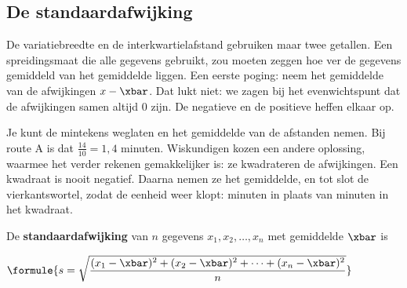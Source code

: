 
\begin{oefeningen}
\end{oefeningen}

\subsection{De standaardafwijking}

De variatiebreedte en de interkwartielafstand gebruiken maar twee getallen. Een spreidingsmaat die alle gegevens gebruikt, zou moeten zeggen hoe ver de gegevens gemiddeld van het gemiddelde liggen. Een eerste poging: neem het gemiddelde van de afwijkingen $x - \xbar$. Dat lukt niet: we zagen bij het evenwichtspunt dat de afwijkingen samen altijd 0 zijn. De negatieve en de positieve heffen elkaar op.

Je kunt de mintekens weglaten en het gemiddelde van de afstanden nemen. Bij route A is dat $\tfrac{14}{10} = 1,4$ minuten. Wiskundigen kozen een andere oplossing, waarmee het verder rekenen gemakkelijker is: ze kwadrateren de afwijkingen. Een kwadraat is nooit negatief. Daarna nemen ze het gemiddelde, en tot slot de vierkantswortel, zodat de eenheid weer klopt: minuten in plaats van minuten in het kwadraat.

\begin{theorie}
De \textbf{\textcolor{accent}{standaardafwijking}} van $n$ gegevens $x_1, x_2, \dots, x_n$ met gemiddelde $\xbar$ is

\vspace{1mm}
\qquad $\formule{s = \sqrt{\dfrac{(x_1 - \xbar)^2 + (x_2 - \xbar)^2 + \cdots + (x_n - \xbar)^2}{n}}}$
\end{theorie}

